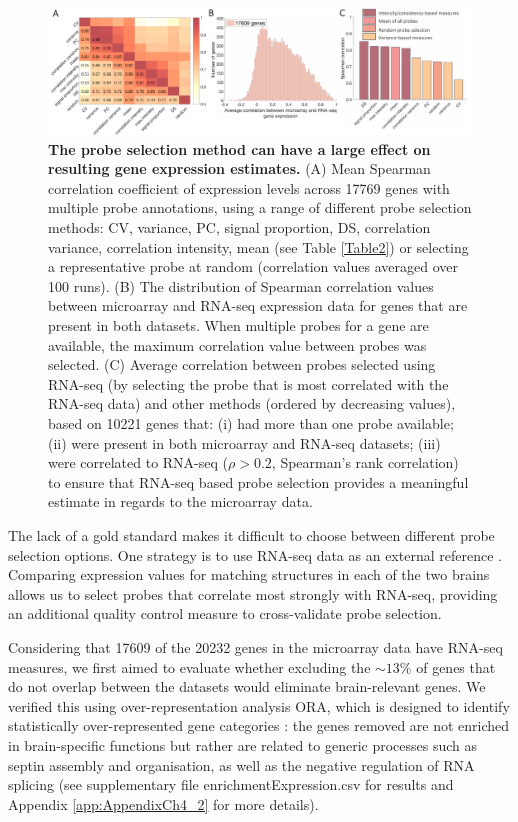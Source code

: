 \begin{figure}[h!]
  \centering
    \includegraphics[width=1\textwidth]{Chapter4/Ch4Fig4.pdf}
\caption{\textbf{The probe selection method can have a large effect on resulting gene expression estimates.}
(A) Mean Spearman correlation coefficient of expression levels across \num{17769} genes with multiple probe annotations, using a range of different probe selection methods: CV, variance, PC, signal proportion, DS, correlation variance, correlation intensity, mean (see Table \ref{Table2}) or selecting a representative probe at random (correlation values averaged over 100 runs).
(B) The distribution of Spearman correlation values between microarray and RNA-seq expression data for genes that are present in both datasets. When multiple probes for a gene are available, the maximum correlation value between probes was selected.
(C) Average correlation between probes selected using RNA-seq (by selecting the probe that is most correlated with the RNA-seq data) and other methods (ordered by decreasing values), based on \num{10221} genes that: (i) had more than one probe available; (ii) were present in both microarray and RNA-seq datasets; (iii) were correlated to RNA-seq ($\rho > 0.2$, Spearman's rank correlation) to ensure that RNA-seq based probe selection provides a meaningful estimate in regards to the microarray data.}
\label{fig:Ch4Fig4}
\end{figure}

The lack of a gold standard makes it difficult to choose between different probe selection options. One strategy is to use RNA-seq data as an external reference \citep{Miller2014a}. Comparing expression values for matching structures in each of the two brains allows us to select probes that correlate most strongly with RNA-seq, providing an additional quality control measure to cross-validate probe selection.

Considering that \num{17609} of the \num{20232} genes in the microarray data have RNA-seq measures, we first aimed to evaluate whether excluding the $\sim13\%$ of genes that do not overlap between the datasets would eliminate brain-relevant genes. We verified this using over-representation analysis ORA, which is designed to identify statistically over-represented gene categories \citep{Gillis2010}: the genes removed are not enriched in brain-specific functions but rather are related to generic processes such as septin assembly and organisation, as well as the negative regulation of RNA splicing (see supplementary file enrichmentExpression.csv for results and Appendix \ref{app:AppendixCh4_2} for more details).

